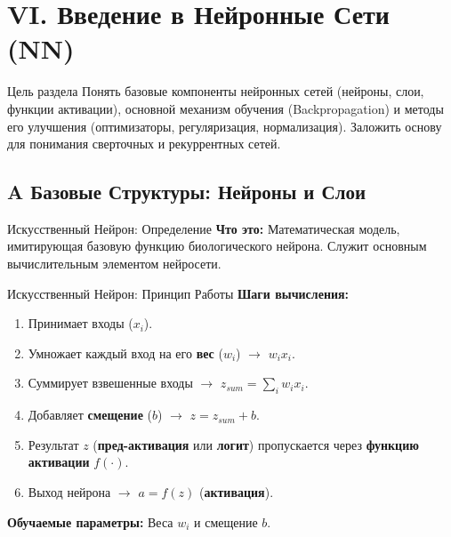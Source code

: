 \section{VI. Введение в Нейронные Сети (NN)}

\begin{textbox}{Цель раздела}
    Понять базовые компоненты нейронных сетей (нейроны, слои, функции активации), основной механизм обучения (Backpropagation) и методы его улучшения (оптимизаторы, регуляризация, нормализация). Заложить основу для понимания сверточных и рекуррентных сетей.
\end{textbox}

\subsection{A Базовые Структуры: Нейроны и Слои}

\begin{myblock}{Искусственный Нейрон: Определение}
    \textbf{Что это:} Математическая модель, имитирующая базовую функцию биологического нейрона. Служит основным вычислительным элементом нейросети.
\end{myblock}

\begin{myexampleblock}{Искусственный Нейрон: Принцип Работы}
    \textbf{Шаги вычисления:}
    \begin{enumerate}[nosep, itemsep=0.5ex]
        \item Принимает входы ($x_i$).
        \item Умножает каждый вход на его \textbf{вес} ($w_i$) $\rightarrow$ $w_i x_i$.
        \item Суммирует взвешенные входы $\rightarrow$ $z_{sum} = \sum_{i} w_i x_i$.
        \item Добавляет \textbf{смещение} ($b$) $\rightarrow$ $z = z_{sum} + b$.
        \item Результат $z$ (\textbf{пред-активация} или \textbf{логит}) пропускается через \textbf{функцию активации} $f(\cdot)$.
        \item Выход нейрона $\rightarrow$ $a = f(z)$ (\textbf{активация}).
    \end{enumerate}
    \textbf{Обучаемые параметры:} Веса $w_i$ и смещение $b$.
\end{myexampleblock}

